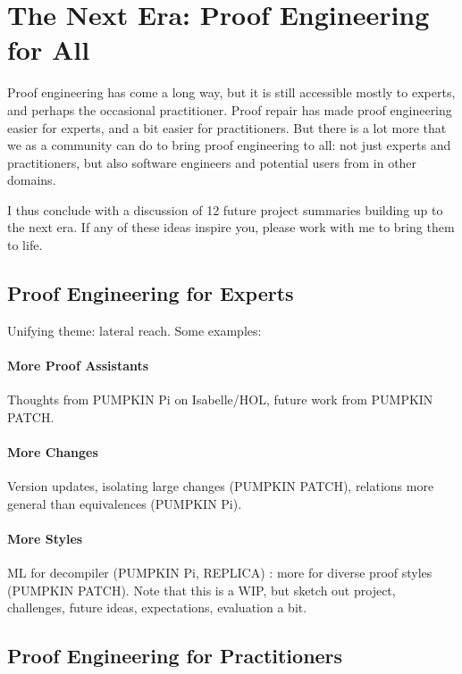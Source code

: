 \section*{The Next Era: Proof Engineering for All}


Proof engineering has come a long way, but it is still accessible mostly to experts, and perhaps the occasional practitioner.
Proof repair has made proof engineering easier for experts, and a bit easier for practitioners.
But there is a lot more that we as a community can do to bring proof engineering to all: not just experts and practitioners,
but also software engineers and potential users from in other domains.

I thus conclude with a discussion of 12 future project summaries building up to the next era.
If any of these ideas inspire you, please work with me to bring them to life.

\subsection*{Proof Engineering for Experts}

Unifying theme: lateral reach. Some examples:

\paragraph{More Proof Assistants} Thoughts from PUMPKIN Pi on Isabelle/HOL, future work from PUMPKIN PATCH.

\paragraph{More Changes} Version updates, isolating large changes (PUMPKIN PATCH), relations more general than equivalences (PUMPKIN Pi).

\paragraph{More Styles} ML for decompiler (PUMPKIN Pi, REPLICA) : more for diverse proof styles (PUMPKIN PATCH). Note that this is a WIP, but sketch out project, challenges, future ideas, expectations, evaluation a bit.

\subsection*{Proof Engineering for Practitioners}

